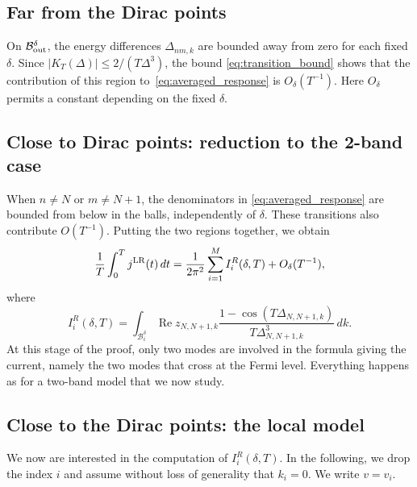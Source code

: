 \documentclass[a4paper,11pt]{article}
\theoremstyle{plain}
\theoremstyle{remark}
\begin{document}
\subsection{Far from the Dirac points}

On $\mathcal B_{\rm out}^\delta$, the energy differences
$\Delta_{nm,k}$ are bounded away from zero for each fixed $\delta$.
Since $|K_T(\Delta)|\le2/(T\Delta^3)$, the bound
\eqref{eq:transition_bound} shows that the contribution of this region
to~\eqref{eq:averaged_response} is $O_\delta(T^{-1})$.
Here $O_\delta$ permits a constant depending on the fixed $\delta$.

\subsection{Close to Dirac points: reduction to the 2-band case}
\label{sec:dirac_reduc}

When $n\ne N$ or $m\ne N+1$, the denominators in
\eqref{eq:averaged_response} are bounded from below in the balls,
independently of $\delta$. These transitions also contribute
$O(T^{-1})$. Putting the two regions together, we obtain
\begin{equation}\label{eq:two_band_average}
\frac1T\int_0^Tj^{\rm LR}(t)\,dt
=\frac1{2\pi^2}\sum_{i=1}^M I_i^R(\delta,T)+O_\delta(T^{-1}),
\end{equation}
where
\begin{equation}\label{eq:IRdt}
I_i^R(\delta,T)=\int_{\mathcal B_i^\delta}
\operatorname{Re}z_{N,N+1,k}
\frac{1-\cos(T\Delta_{N,N+1,k})}{T\Delta_{N,N+1,k}^3}\,dk.
\end{equation}
At this stage of the proof, only two modes are involved in the formula
giving the current, namely the two modes that cross at the Fermi level.
Everything happens as for a two-band model that we now study.


\subsection{Close to the Dirac points: the local model}
We now are interested in the computation of $I_i^R(\delta,T)$.
In the following, we drop the index $i$ and assume without loss of
generality that $k_i=0$. We write $v=v_i$.
\end{document}
